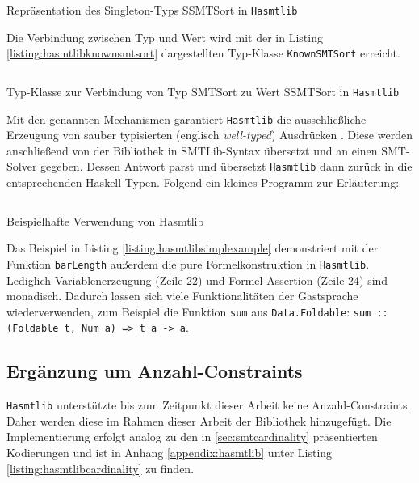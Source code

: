 \begin{listing}[H]
    \inputminted[linenos=true]{haskell}{Code/Implementierung/Hasmtlib/SSMTSort.hs}
    \caption{Repräsentation des Singleton-Typs SSMTSort in \texttt{Hasmtlib} \cite{hasmtlibSSMTSort}}
    \label{listing:hasmtlibssmtsort}
\end{listing}

Die Verbindung zwischen Typ und Wert wird mit der in Listing \ref{listing:hasmtlibknownsmtsort} dargestellten Typ-Klasse \texttt{KnownSMTSort} erreicht.

\begin{listing}[H]
    \inputminted[linenos=true]{haskell}{Code/Implementierung/Hasmtlib/KnownSMTSort.hs}
    \caption{Typ-Klasse zur Verbindung von Typ SMTSort zu Wert SSMTSort in \texttt{Hasmtlib} \cite{hasmtlibSSMTSort}}
    \label{listing:hasmtlibknownsmtsort}
\end{listing}

Mit den genannten Mechanismen garantiert \texttt{Hasmtlib} die ausschließliche Erzeugung von sauber typisierten (englisch \textit{well-typed}) Ausdrücken \cite{gadts}.
Diese werden anschließend von der Bibliothek in SMTLib-Syntax übersetzt und an einen SMT-Solver gegeben.
Dessen Antwort parst und übersetzt \texttt{Hasmtlib} dann zurück in die entsprechenden Haskell-Typen.
Folgend ein kleines Programm zur Erläuterung:

\begin{listing}[H]
    \inputminted[linenos=true]{haskell}{Code/Implementierung/Hasmtlib/BeispielSimple.hs}
    \caption{Beispielhafte Verwendung von Hasmtlib}
    \label{listing:hasmtlibsimplexample}
\end{listing}

Das Beispiel in Listing \ref{listing:hasmtlibsimplexample} demonstriert mit der Funktion \texttt{barLength} außerdem die pure Formelkonstruktion in \texttt{Hasmtlib}.
Lediglich Variablenerzeugung (Zeile 22) und Formel-Assertion (Zeile 24) sind monadisch.
Dadurch lassen sich viele Funktionalitäten der Gastsprache wiederverwenden, zum Beispiel die Funktion \texttt{sum} aus \texttt{Data.Foldable}:
\texttt{sum :: (Foldable t, Num a) => t a -> a}.

\subsection{Ergänzung um Anzahl-Constraints}
\label{subsec:implCardinality}
\texttt{Hasmtlib} unterstützte bis zum Zeitpunkt dieser Arbeit keine Anzahl-Constraints.
Daher werden diese im Rahmen dieser Arbeit der Bibliothek hinzugefügt.
Die Implementierung erfolgt analog zu den in \ref{sec:smtcardinality} präsentierten Kodierungen und ist in
Anhang \ref{appendix:hasmtlib} unter Listing \ref{listing:hasmtlibcardinality} zu finden.

